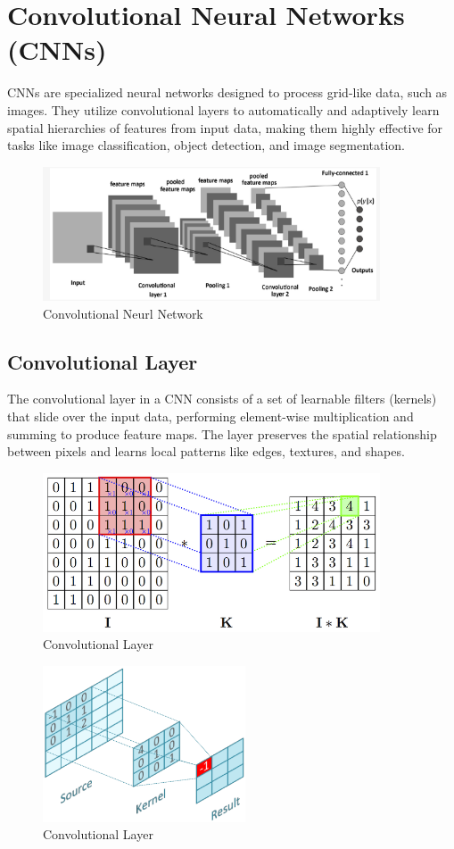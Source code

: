 \section{Convolutional Neural Networks (CNNs)}
CNNs are specialized neural networks designed to process grid-like data, such as images. They utilize convolutional layers to automatically and adaptively learn spatial hierarchies of features from input data, making them highly effective for tasks like image classification, object detection, and image segmentation.
\begin{figure}[ht]
    \centering
    \includegraphics[width=10cm]{images/Theory-DL/CNN.png}
    \caption{Convolutional Neurl Network}
    \label{fig:CNN}
  \end{figure}
\subsection{Convolutional Layer}
The convolutional layer in a CNN consists of a set of learnable filters (kernels) that slide over the input data, performing element-wise multiplication and summing to produce feature maps. The layer preserves the spatial relationship between pixels and learns local patterns like edges, textures, and shapes. 
\begin{figure}[ht]
    \centering
    \includegraphics[width=10cm]{images/Theory-DL/Conv1.png}
    \caption{Convolutional Layer}
    \label{fig:Conv1}
  \end{figure}
\begin{figure}[ht]
    \centering
    \includegraphics[width=6cm]{images/Theory-DL/Conv2.png}
    \caption{Convolutional Layer}
    \label{fig:Conv2}
\end{figure}
